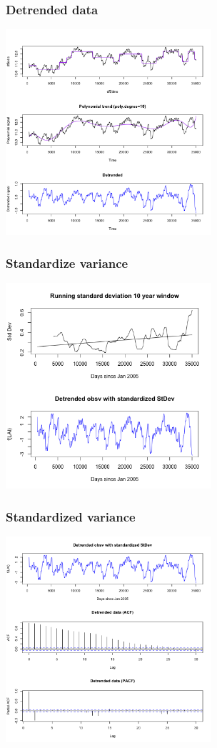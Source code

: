 \documentclass{beamer}
\begin{document}
\begin{frame}
\frametitle{Detrended data}
\includegraphics[height=3in]{../img/detrended_acf_pacf.png}
\end{frame}

\begin{frame}
\frametitle{Standardize variance}
\includegraphics[height=3in]{../img/standatdized_var_LAI.png}
\end{frame}

\begin{frame}
\frametitle{Standardized variance}
\includegraphics[height=3in]{../img/detrended_stdzd_acf_pacf.png}
\end{frame}
\end{document}

